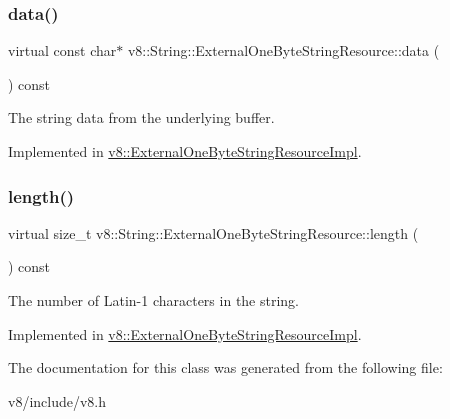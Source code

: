 \subsubsection{\texorpdfstring{data()}{data()}}
{\footnotesize\ttfamily virtual const char$\ast$ v8\+::\+String\+::\+External\+One\+Byte\+String\+Resource\+::data (\begin{DoxyParamCaption}{ }\end{DoxyParamCaption}) const\hspace{0.3cm}{\ttfamily [pure virtual]}}

The string data from the underlying buffer. 

Implemented in \mbox{\hyperlink{classv8_1_1ExternalOneByteStringResourceImpl_a417ecb5eb304b12c8806ff6d0306bc09}{v8\+::\+External\+One\+Byte\+String\+Resource\+Impl}}.

\mbox{\label{classv8_1_1String_1_1ExternalOneByteStringResource_ad6b702f05798bcfc3975cb922f32b5ab}} 
\subsubsection{\texorpdfstring{length()}{length()}}
{\footnotesize\ttfamily virtual size\+\_\+t v8\+::\+String\+::\+External\+One\+Byte\+String\+Resource\+::length (\begin{DoxyParamCaption}{ }\end{DoxyParamCaption}) const\hspace{0.3cm}{\ttfamily [pure virtual]}}

The number of Latin-\/1 characters in the string. 

Implemented in \mbox{\hyperlink{classv8_1_1ExternalOneByteStringResourceImpl_a4015ab4f74c209ac484e5183b2039f58}{v8\+::\+External\+One\+Byte\+String\+Resource\+Impl}}.



The documentation for this class was generated from the following file\+:\begin{DoxyCompactItemize}
\item 
v8/include/v8.\+h\end{DoxyCompactItemize}
